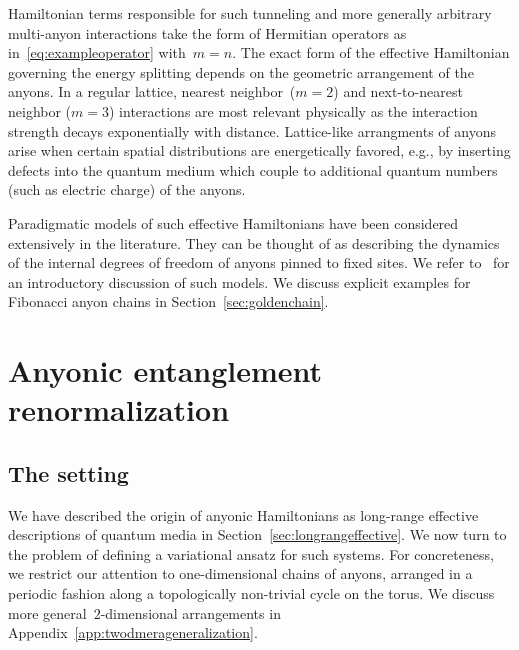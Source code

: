 \documentclass[floats,prb,twocolumn]{revtex4}
\begin{document}
Hamiltonian terms responsible for such tunneling and more generally arbitrary multi-anyon interactions take the form of Hermitian operators as in~\eqref{eq:exampleoperator} with~$m=n$. The exact form of the effective Hamiltonian 
governing the energy splitting depends on the geometric arrangement of the anyons. In a regular lattice, nearest neighbor~($m=2$) and next-to-nearest neighbor ($m=3$) interactions are most relevant physically as the interaction strength decays exponentially with distance. Lattice-like  arrangments of anyons arise when certain spatial distributions are energetically favored, e.g., by inserting defects into the quantum medium which couple to additional quantum numbers  (such as electric charge) of the anyons.  


Paradigmatic models of such effective Hamiltonians have been considered extensively in the literature. They can be thought of as describing the dynamics of the  internal degrees of freedom of anyons pinned to fixed sites.  
 We refer to~\cite{Trebstetal08} for an introductory discussion of such models. We discuss explicit examples for Fibonacci anyon chains in Section~\ref{sec:goldenchain}.

\section{Anyonic entanglement renormalization\label{sec:anyonicMERA}}
\subsection{The setting\label{sec:settinganyonicMERA}}
We have described the origin of anyonic Hamiltonians as long-range effective descriptions of quantum media in Section~\ref{sec:longrangeffective}. We now turn to the problem of defining a variational ansatz for such systems. For concreteness, we restrict our attention to one-dimensional chains of anyons, arranged in a periodic fashion along a topologically non-trivial cycle on the torus. We discuss  more general~$2$-dimensional arrangements in Appendix~\ref{app:twodmerageneralization}.
\end{document}
